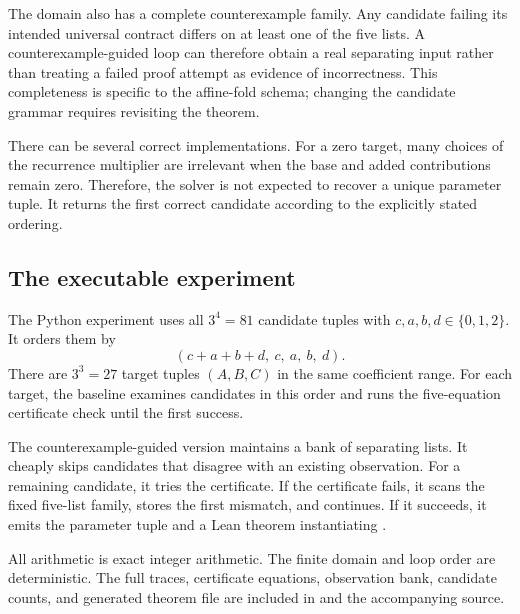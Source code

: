 The domain also has a complete counterexample family. Any candidate failing its intended universal contract differs on at least one of the five lists. A counterexample-guided loop can therefore obtain a real separating input rather than treating a failed proof attempt as evidence of incorrectness. This completeness is specific to the affine-fold schema; changing the candidate grammar requires revisiting the theorem.

There can be several correct implementations. For a zero target, many choices of the recurrence multiplier are irrelevant when the base and added contributions remain zero. Therefore, the solver is not expected to recover a unique parameter tuple. It returns the first correct candidate according to the explicitly stated ordering.

\subsection{The executable experiment}
The Python experiment uses all $3^4=81$ candidate tuples with $c,a,b,d\in\{0,1,2\}$. It orders them by
\[
 (c+a+b+d,\ c,\ a,\ b,\ d).
\]
There are $3^3=27$ target tuples $(A,B,C)$ in the same coefficient range. For each target, the baseline examines candidates in this order and runs the five-equation certificate check until the first success.

The counterexample-guided version maintains a bank of separating lists. It cheaply skips candidates that disagree with an existing observation. For a remaining candidate, it tries the certificate. If the certificate fails, it scans the fixed five-list family, stores the first mismatch, and continues. If it succeeds, it emits the parameter tuple and a Lean theorem instantiating .

All arithmetic is exact integer arithmetic. The finite domain and loop order are deterministic. The full traces, certificate equations, observation bank, candidate counts, and generated theorem file are included in  and the accompanying source.

